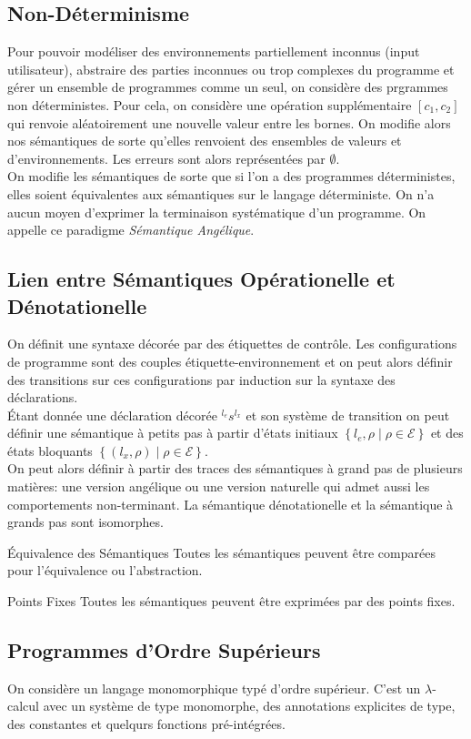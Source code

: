 \documentclass{cours}
\begin{document}
\subsection{Non-Déterminisme}
Pour pouvoir modéliser des environnements partiellement inconnus (input utilisateur), abstraire des parties inconnues ou trop complexes du programme et gérer un ensemble de programmes comme un seul, on considère des prgrammes non déterministes. Pour cela, on considère une opération supplémentaire $[c_{1}, c_{2}]$ qui renvoie aléatoirement une nouvelle valeur entre les bornes. On modifie alors nos sémantiques de sorte qu'elles renvoient des ensembles de valeurs et d'environnements. Les erreurs sont alors représentées par $\emptyset$.\\
On modifie les sémantiques de sorte que si l'on a des programmes déterministes, elles soient équivalentes aux sémantiques sur le langage déterministe. On n'a aucun moyen d'exprimer la terminaison systématique d'un programme. On appelle ce paradigme \textit{Sémantique Angélique}.

\subsection{Lien entre Sémantiques Opérationelle et Dénotationelle}
On définit une syntaxe décorée par des étiquettes de contrôle. Les configurations de programme sont des couples étiquette-environnement et on peut alors définir des transitions sur ces configurations par induction sur la syntaxe des déclarations. \\
Étant donnée une déclaration décorée $^{l_{e}}s^{l_{x}}$ et son système de transition on peut définir une sémantique à petits pas à partir d'états initiaux $\left\{l_{e}, \rho \mid \rho \in \mathcal{E}\right\}$ et des états bloquants $\left\{(l_{x}, \rho) \mid \rho \in \mathcal{E}\right\}$.\\
On peut alors définir à partir des traces des sémantiques à grand pas de plusieurs matières: une version angélique ou une version naturelle qui admet aussi les comportements non-terminant. La sémantique dénotationelle et la sémantique à grands pas sont isomorphes. 
\begin{théorème}{Équivalence des Sémantiques}{}
    Toutes les sémantiques peuvent être comparées pour l'équivalence ou l'abstraction.
\end{théorème}

\begin{théorème}{Points Fixes}{}
    Toutes les sémantiques peuvent être exprimées par des points fixes.
\end{théorème}

\subsection{Programmes d'Ordre Supérieurs}
On considère un langage monomorphique typé d'ordre supérieur. C'est un $\lambda$-calcul avec un système de type monomorphe, des annotations explicites de type, des constantes et quelqurs fonctions pré-intégrées.\\
\end{document}
